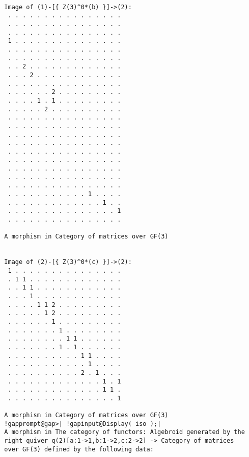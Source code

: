 \documentclass[a4paper,11pt]{report}
\begin{document}
{{{\begin{Verbatim}[commandchars=!@|,fontsize=\small,frame=single,label=Example]
  
  Image of (1)-[{ Z(3)^0*(b) }]->(2):
   . . . . . . . . . . . . . . . .
   . . . . . . . . . . . . . . . .
   . . . . . . . . . . . . . . . .
   1 . . . . . . . . . . . . . . .
   . . . . . . . . . . . . . . . .
   . . . . . . . . . . . . . . . .
   . . 2 . . . . . . . . . . . . .
   . . . 2 . . . . . . . . . . . .
   . . . . . . . . . . . . . . . .
   . . . . . . 2 . . . . . . . . .
   . . . . 1 . 1 . . . . . . . . .
   . . . . . 2 . . . . . . . . . .
   . . . . . . . . . . . . . . . .
   . . . . . . . . . . . . . . . .
   . . . . . . . . . . . . . . . .
   . . . . . . . . . . . . . . . .
   . . . . . . . . . . . . . . . .
   . . . . . . . . . . . . . . . .
   . . . . . . . . . . . . . . . .
   . . . . . . . . . . . . . . . .
   . . . . . . . . . . . . . . . .
   . . . . . . . . . . . 1 . . . .
   . . . . . . . . . . . . . 1 . .
   . . . . . . . . . . . . . . . 1
   . . . . . . . . . . . . . . . .
  
  A morphism in Category of matrices over GF(3)
  
  
  Image of (2)-[{ Z(3)^0*(c) }]->(2):
   1 . . . . . . . . . . . . . . .
   . 1 1 . . . . . . . . . . . . .
   . . 1 1 . . . . . . . . . . . .
   . . . 1 . . . . . . . . . . . .
   . . . . 1 1 2 . . . . . . . . .
   . . . . . 1 2 . . . . . . . . .
   . . . . . . 1 . . . . . . . . .
   . . . . . . . 1 . . . . . . . .
   . . . . . . . . 1 1 . . . . . .
   . . . . . . . 1 . 1 . . . . . .
   . . . . . . . . . . 1 1 . . . .
   . . . . . . . . . . . 1 . . . .
   . . . . . . . . . . 2 . 1 . . .
   . . . . . . . . . . . . . 1 . 1
   . . . . . . . . . . . . . 1 1 .
   . . . . . . . . . . . . . . . 1
  
  A morphism in Category of matrices over GF(3)
  !gapprompt@gap>| !gapinput@Display( iso );|
  A morphism in The category of functors: Algebroid generated by the
  right quiver q(2)[a:1->1,b:1->2,c:2->2] -> Category of matrices
  over GF(3) defined by the following data:
  

\end{Verbatim}}}}
\end{document}
